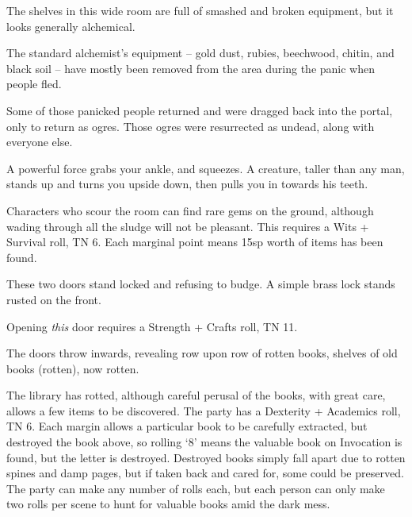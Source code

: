 \begin{multicols}{2}


\begin{boxtext}

	The shelves in this wide room are full of smashed and broken equipment, but it looks generally alchemical.

\end{boxtext}

The standard alchemist's equipment -- gold dust, rubies, beechwood, chitin, and black soil -- have mostly been removed from the area during the panic when people fled.

Some of those panicked people returned and were dragged back into the portal, only to return as ogres.  Those ogres were resurrected as undead, along with everyone else.

\begin{boxtext}

	A powerful force grabs your ankle, and squeezes.
	A creature, taller than any man, stands up and turns you upside down, then pulls you in towards his teeth.

\end{boxtext}



Characters who scour the room can find rare gems on the ground, although wading through all the sludge will not be pleasant.
This requires a Wits + Survival roll, TN 6.
Each marginal point means 15sp worth of items has been found.


\begin{boxtext}

	These two doors stand locked and refusing to budge.  A simple brass lock stands rusted on the front.

\end{boxtext}

Opening \emph{this} door requires a Strength + Crafts roll, TN 11.

\begin{boxtext}
	The doors throw inwards, revealing row upon row of rotten books, shelves of old books (rotten), now rotten.
\end{boxtext}

The library has rotted, although careful perusal of the books, with great care, allows a few items to be discovered.
The party has a Dexterity + Academics roll, TN 6.
Each margin allows a particular book to be carefully extracted, but destroyed the book above, so rolling `8' means the valuable book on Invocation is found, but the letter is destroyed.
Destroyed books simply fall apart due to rotten spines and damp pages, but if taken back and cared for, some could be preserved.
The party can make any number of rolls each, but each person can only make two rolls per scene to hunt for valuable books amid the dark mess.


\end{multicols}
